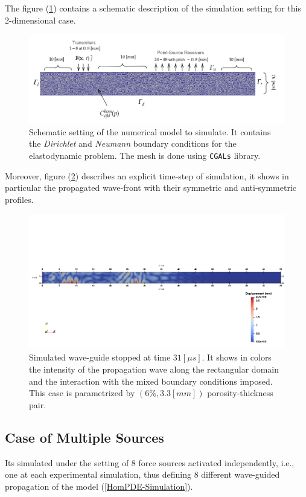 The figure (\ref{MeshFile2D}) contains a schematic description of the simulation setting for this 2-dimensional case. 
\begin{figure}[!h]
	\centering
	\includegraphics[width=\textwidth]{images/ImgExt/SimP5TransIso12M780-MeshFile.png}
	\caption{Schematic setting of the numerical model to simulate. It contains the \textit{Dirichlet} and \textit{Neumann} boundary conditions for the elastodynamic problem. The mesh is done using \texttt{CGALs} library.}
	\label{MeshFile2D}
\end{figure}

Moreover, figure (\ref{Sim2D-TimeStep}) describes an explicit time-step of simulation, it shows in particular the propagated wave-front with their symmetric and anti-symmetric profiles.
\begin{figure}[!h]
	\centering
	\includegraphics[width=\textwidth]{images/ImgExt/SimP6TransIso33M780T310.png}
	\caption{Simulated wave-guide stopped at time $31 [\mu s]$. It shows in colors the intensity of the propagation wave along the rectangular domain and the interaction with the mixed boundary conditions imposed. This case is parametrized by $(6\%, 3.3 [mm])$ porosity-thickness pair.}
	\label{Sim2D-TimeStep}
\end{figure}



\subsection{Case of Multiple Sources}
Its simulated under the setting of 8 force sources activated independently, i.e., one at each experimental simulation, thus defining 8 different wave-guided propagation of the model (\ref{HomPDE-Simulation}).

